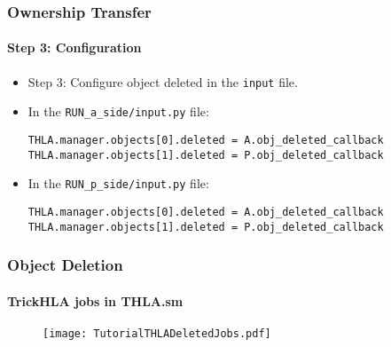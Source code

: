    \begin{frame}[fragile]
      \frametitle{Ownership Transfer}
      \framesubtitle{Step 3: Configuration}
      \begin{itemize}
         \item Step 3: Configure object deleted in the \texttt{input} file.
         \item In the \texttt{RUN\_a\_side/input.py} file:
\begin{Verbatim}[frame=single, fontsize=\scriptsize]
THLA.manager.objects[0].deleted = A.obj_deleted_callback
THLA.manager.objects[1].deleted = P.obj_deleted_callback
\end{Verbatim}
         \item In the \texttt{RUN\_p\_side/input.py} file:
\begin{Verbatim}[frame=single, fontsize=\scriptsize]
THLA.manager.objects[0].deleted = A.obj_deleted_callback
THLA.manager.objects[1].deleted = P.obj_deleted_callback
\end{Verbatim}
      \end{itemize}
   \end{frame}
   
   \begin{frame}
      \frametitle{Object Deletion}
      \framesubtitle{TrickHLA jobs in THLA.sm}
      \begin{figure}
      \texttt{[image: TutorialTHLADeletedJobs.pdf]}
      \end{figure}
   \end{frame}
